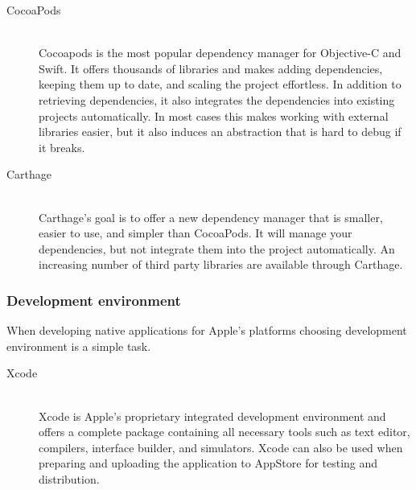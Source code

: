 \begin{description} 
    \item[CocoaPods] \hfill \\
        Cocoapods is the most popular dependency manager for Objective-C and Swift. It offers thousands of libraries and makes adding dependencies, keeping them up to date, and scaling the project effortless. In addition to retrieving dependencies, it also integrates the dependencies into existing projects automatically. In most cases this makes working with external libraries easier, but it also induces an abstraction that is hard to debug if it breaks.
    \item[Carthage] \hfill \\
        Carthage's goal is to offer a new dependency manager that is smaller, easier to use, and simpler than CocoaPods. It will manage your dependencies, but not integrate them into the project automatically. An increasing number of third party libraries are available through Carthage.
\end{description}


\subsubsection{Development environment}
When developing native applications for Apple's platforms choosing development environment is a simple task.

\begin{description} 
    \item[Xcode] \hfill \\
        Xcode is Apple's proprietary integrated development environment and offers a complete package containing all necessary tools such as text editor, compilers, interface builder, and simulators.\cite{xcode} Xcode can also be used when preparing and uploading the application to AppStore for testing and distribution.
\end{description}


